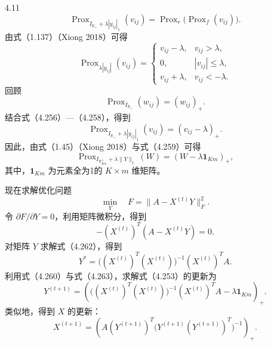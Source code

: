 \begin{bookexample}{4.11}
\begin{equation}
\operatorname{Prox}_{I_{\mathbb R_+}+\lambda|y_{ij}|_1}(v_{ij})
=\operatorname{Prox}_r\bigl(\operatorname{Prox}_f(v_{ij})\bigr).\tag{4.256}
\end{equation}
由式（1.137）（Xiong 2018）可得
\begin{equation}
\operatorname{Prox}_{\lambda|y_{ij}|}(v_{ij})=
\begin{cases}
v_{ij}-\lambda,&v_{ij}>\lambda,\\
0,&|v_{ij}|\le\lambda,\\
v_{ij}+\lambda,&v_{ij}<-\lambda.
\end{cases}\tag{4.257}
\end{equation}
回顾
\begin{equation}
\operatorname{Prox}_{I_{\mathbb R_+}}(w_{ij})=(w_{ij})_+.\tag{4.258}
\end{equation}
结合式（4.256）—（4.258），得到
\begin{equation}
\operatorname{Prox}_{I_{\mathbb R_+}+\lambda|y_{ij}|_1}(v_{ij})
=(v_{ij}-\lambda)_+.\tag{4.259}
\end{equation}
因此，由式（1.45）（Xiong 2018）与式（4.259）可得
\begin{equation}
\operatorname{Prox}_{I_{\mathbb R_{Km}^{+}}+\lambda\|Y\|_1}(W)
=(W-\lambda\mathbf1_{Km})_+,\tag{4.260}
\end{equation}
其中，$\mathbf1_{Km}$ 为元素全为1的 $K\times m$ 维矩阵。

现在求解优化问题
\begin{equation}
\min_Y\quad F=\|A-X^{(t)}Y\|_F^2.\tag{4.261}
\end{equation}
令 $\partial F/\partial Y=0$，利用矩阵微积分，得到
\begin{equation}
-(X^{(t)})^T(A-X^{(t)}Y)=0.\tag{4.262}
\end{equation}
对矩阵 $Y$ 求解式（4.262），得到
\begin{equation}
Y^*=\bigl((X^{(t)})^T(X^{(t)})\bigr)^{-1}(X^{(t)})^TA.\tag{4.263}
\end{equation}
利用式（4.260）与式（4.263），求解式（4.253）的更新为
\begin{equation}
Y^{(t+1)}=\left(
\bigl((X^{(t)})^T(X^{(t)})\bigr)^{-1}(X^{(t)})^TA-\lambda\mathbf1_{Km}
\right)_+.\tag{4.264}
\end{equation}
类似地，得到 $X$ 的更新：
\begin{equation}
X^{(t+1)}=\left(
A(Y^{(t+1)})^T\bigl(Y^{(t+1)}(Y^{(t+1)})^T\bigr)^{-1}
\right)_+.\tag{4.265}
\end{equation}
\end{bookexample}

